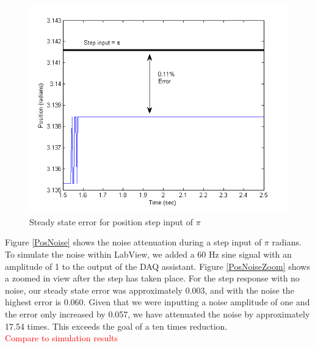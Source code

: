 \documentclass{article}
\newcommand{\xxx}[1]{\textcolor{red}{#1}}
\theoremstyle{plain}
\theoremstyle{definition}
\theoremstyle{remark}
\begin{document}
\begin{figure}[htb]
\begin{center}
\includegraphics[width = 12cm]{positionStepError.png}
\caption{Steady state error for position step input of $\pi$}
\label{PosStepError}
\end{center}
\end{figure}

Figure \ref{PosNoise} shows the noise attenuation during a step input of $\pi$ radians. To simulate the noise within LabView, we added a 60 Hz sine signal with an amplitude of 1 to the output of the DAQ assistant. Figure \ref{PosNoiseZoom} shows a zoomed in view after the step has taken place. For the step response with no noise, our steady state error was approximately 0.003, and with the noise the highest error is 0.060. Given that we were inputting a noise amplitude of one and the error only increased by 0.057, we have attenuated the noise by approximately 17.54 times. This exceeds the goal of a ten times reduction.\\

\xxx{Compare to simulation results}
\end{document}
